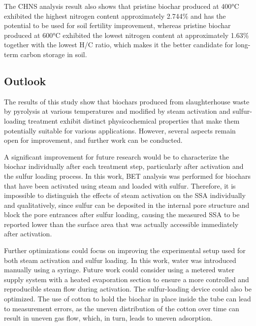 \vspace{0.3em}

The CHNS analysis result also shows that pristine biochar produced at 400°C exhibited the highest nitrogen content approximately 2.744\% and has the potential to be used for soil fertility improvement, whereas pristine biochar produced at 600°C exhibited the lowest nitrogen content at approximately 1.63\% together with the lowest H/C ratio, which makes it the better candidate for long-term carbon storage in soil.


\subsection{Outlook}

The results of this study show that biochars produced from slaughterhouse waste by pyrolysis at various temperatures and modified by steam activation and sulfur-loading treatment exhibit distinct physicochemical properties that make them potentially suitable for various applications. However, several aspects remain open for improvement, and further work can be conducted.

\vspace{0.3em}

A significant improvement for future research would be to characterize the biochar individually after each treatment step, particularly after activation and the sulfur loading process. In this work, BET analysis was performed for biochars that have been activated using steam and loaded with sulfur. Therefore, it is impossible to distinguish the effects of steam activation on the SSA individually and qualitatively, since sulfur can be deposited in the internal pore structure and block the pore entrances after sulfur loading, causing the measured SSA to be reported lower than the surface area that was actually accessible immediately after activation.

\vspace{0.3em} 

Further optimizations could focus on improving the experimental setup used for both steam activation and sulfur loading. In this work, water was introduced manually using a syringe. Future work could consider using a metered water supply system with a heated evaporation section to ensure a more controlled and reproducible steam flow during activation. The sulfur-loading device could also be optimized. The use of cotton to hold the biochar in place inside the tube can lead to measurement errors, as the uneven distribution of the cotton over time can result in uneven gas flow, which, in turn, leads to uneven adsorption. 

